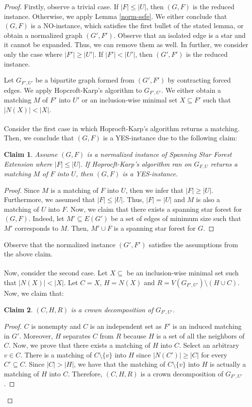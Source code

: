 \documentclass[en]{pracamgr}
\newtheorem{claim}{Claim}
\theoremstyle{definition}
\newcommand{\ssfep}{{\sc Spanning Star Forest Extension}}
\begin{document}
\begin{proof}
	Firstly, observe a trivial case. If $|F| \leq |U|$, then $(G,F)$ is the reduced instance. Otherwise, we apply Lemma \ref{norm-ssfe}. We either conclude that $(G,F)$ is a NO-instance, which satisfies the first bullet of the stated lemma, or obtain a normalized graph $(G',F')$. Observe that an isolated edge is a star and it cannot be expanded. Thus, we can remove them as well. In further, we consider only the case where $|F'| \geq |U'|$. If $|F'| < |U'|$, then $(G',F')$ is the reduced instance.
	
	Let $G_{F',U'}$ be a bipartite graph formed from $(G',F')$ by contracting forced edges. We apply Hopcroft-Karp's algorithm to $G_{F',U'}$. We either obtain a matching $M$ of $F'$ into $U'$ or an inclusion-wise minimal set $X \subseteq F'$ such that $|N(X)| < |X|$.
	\\\\
	Consider the first case in which Hoprocft-Karp's algorithm returns a matching. Then, we conclude that $(G,F)$ is a YES-instance due to the following claim:
	\begin{claim}
		Assume $(G,F)$ is a normalized instance of \ssfep{} where $|F| \leq |U|$. If Hoprocft-Karp's algorithm ran on $G_{F,U}$ returns a matching $M$ of $F$ into $U$, then $(G,F)$ is a YES-instance.
	\end{claim}

	\begin{proof}
		Since $M$ is a matching of $F$ into $U$, then we infer that $|F| \geq |U|$. Furthermore, we assumed that $|F| \leq |U|$. Thus, $|F|=|U|$ and $M$ is also a matching of $U$ into $F$. Now, we claim that there exists a spanning star forest for $(G,F)$. Indeed, let $M' \subseteq E(G')$ be a set of edges of minimum size such that $M'$ corresponds to $M$. Then, $M' \cup F$ is a spanning star forest for $G$.
	\end{proof}
	\noindent
	Observe that the normalized instance $(G',F')$ satisfies the assumptions from the above claim.
	\\\\
	Now, consider the second case. Let $X \subseteq$ be an inclusion-wise minimal set such that $|N(X)| < |X|$. Let $C=X$, $H=N(X)$ and $R= V(G_{F',U'}) \setminus (H \cup C)$. Now, we claim that:
	\begin{claim}
		$(C,H,R)$ is a crown decomposition of $G_{F',U'}$.
	\end{claim}
	\begin{proof}
		$C$ is nonempty and $C$ is an independent set as $F'$ is an induced matching in $G'$. Moreover, $H$ separates $C$ from $R$ because $H$ is a set of all the neighbors of $C$. Now, we prove that there exists a matching of $H$ into $C$. Select an arbitrary $v \in C$. There is a matching of $C \setminus \{v\}$ into $H$ since $|N(C')| \geq |C|$ for every $C' \subseteq C$. Since $|C| > |H|$, we have that the matching of $C \setminus \{v\}$ into $H$ is actually a matching of $H$ into $C$. Therefore, $(C,H,R)$ is a crown decomposition of $G_{F',U'}$.
	\end{proof}
	
\end{proof}
\end{document}
